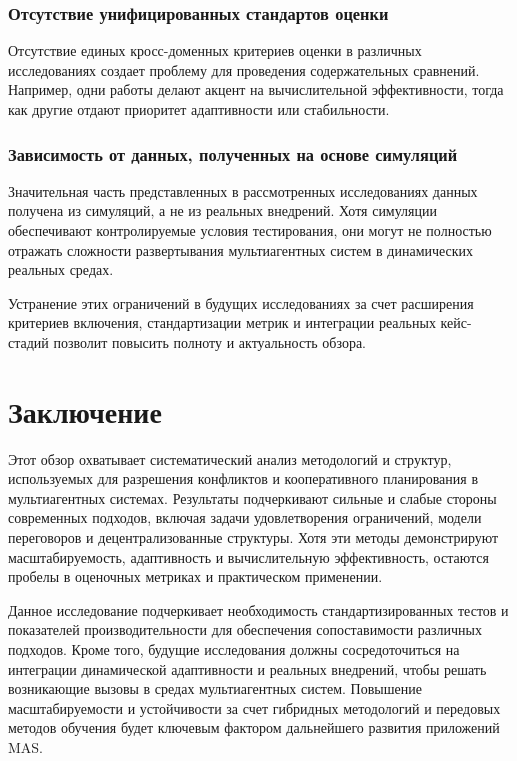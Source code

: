 \documentclass[%
]{ittmm}
\begin{document}
\subsubsection{Отсутствие унифицированных стандартов оценки}

Отсутствие единых кросс-доменных критериев оценки в различных исследованиях
создает проблему для проведения содержательных сравнений.
Например, одни работы делают акцент на вычислительной эффективности,
тогда как другие отдают приоритет адаптивности или стабильности.

\subsubsection{Зависимость от данных, полученных на основе симуляций}

Значительная часть представленных в рассмотренных исследованиях данных получена из симуляций,
а не из реальных внедрений. Хотя симуляции обеспечивают контролируемые условия тестирования,
они могут не полностью отражать сложности развертывания мультиагентных систем в динамических реальных средах.  

Устранение этих ограничений в будущих исследованиях за счет расширения критериев включения,
стандартизации метрик и интеграции реальных кейс-стадий позволит повысить полноту и актуальность обзора.

\section{Заключение}

Этот обзор охватывает систематический анализ методологий и структур,
используемых для разрешения конфликтов и кооперативного планирования в мультиагентных системах.
Результаты подчеркивают сильные и слабые стороны современных подходов,
включая задачи удовлетворения ограничений, модели переговоров и децентрализованные структуры.
Хотя эти методы демонстрируют масштабируемость, адаптивность и вычислительную эффективность,
остаются пробелы в оценочных метриках и практическом применении.  

Данное исследование подчеркивает необходимость стандартизированных тестов и показателей производительности
для обеспечения сопоставимости различных подходов.
Кроме того, будущие исследования должны сосредоточиться на интеграции динамической адаптивности и реальных внедрений,
чтобы решать возникающие вызовы в средах мультиагентных систем.
Повышение масштабируемости и устойчивости за счет гибридных методологий и передовых методов обучения
будет ключевым фактором дальнейшего развития приложений MAS.  
\end{document}
